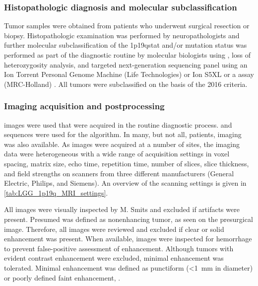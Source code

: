 \subsubsection{Histopathologic diagnosis and molecular subclassification}

Tumor samples were obtained from patients who underwent surgical resection or biopsy.
Histopathologic examination was performed by neuropathologists and further molecular subclassification of the \acl{1p19qstat} and/or  mutation status was performed as part of the diagnostic routine by molecular biologists using , loss of heterozygosity analysis, and targeted next-generation sequencing panel using an Ion Torrent Personal Genome Machine (Life Technologies) or Ion S5XL or a  assay (MRC-Holland) \autocite{dubbink2015molecular, dubbink2016diagnostic, riemenschneider2010molecular, bienkowski2018molecular}.
All tumors were subclassified on the basis of the  2016 criteria.

\subsubsection{Imaging acquisition and postprocessing}

 images were used that were acquired in the routine diagnostic process.
 and   sequences were used for the algorithm.
In many, but not all, patients,  imaging was also available.
As images were acquired at a number of sites, the imaging data were heterogeneous with a wide range of acquisition settings in voxel spacing, matrix size, echo time, repetition time, number of slices, slice thickness, and field strengths on scanners from three different manufacturers (General Electric, Philips, and Siemens).
An overview of the scanning settings is given in \cref{tab:LGG_1p19q_MRI_settings}.

All images were visually inspected by M. Smits and excluded if  artifacts were present.
Presumed  was defined as nonenhancing tumor, as seen on the presurgical   image.
Therefore, all  images were reviewed and excluded if clear or solid enhancement was present.
When available,  images were inspected for hemorrhage to prevent false-positive assessment of enhancement.
Although tumors with evident contrast enhancement were excluded, minimal enhancement was tolerated.
Minimal enhancement was defined as punctiform (\SI{<1}{\milli\meter} in diameter) or poorly defined faint enhancement, .

